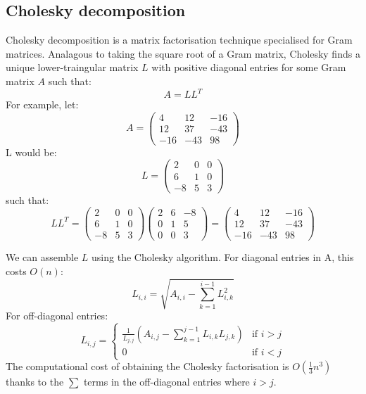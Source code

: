 \subsection{Cholesky decomposition}
Cholesky decomposition \cite{gp-ml} is a matrix factorisation technique specialised for Gram matrices. Analagous to taking the square root of a Gram matrix, Cholesky finds a unique lower-traingular matrix $L$ with positive diagonal entries for some Gram matrix $A$ such that:
\begin{equation} \label{eq:cholesky-factor}
    A = LL^T
\end{equation}
For example, let:
\begin{equation*}
    A = \begin{pmatrix}
        4 & 12 & -16 \\ 
        12 & 37 & -43 \\
        -16 & -43 & 98
    \end{pmatrix}
\end{equation*}
L would be:
\begin{equation*}
    L = \begin{pmatrix}
        2 & 0 & 0 \\
        6 & 1 & 0 \\
        -8 & 5 & 3 
    \end{pmatrix}
\end{equation*}
such that:
\begin{equation*}
    LL^T = \begin{pmatrix}
        2 & 0 & 0 \\
        6 & 1 & 0 \\
        -8 & 5 & 3 
    \end{pmatrix} \begin{pmatrix}
        2 & 6 & -8 \\
        0 & 1 & 5 \\
        0 & 0 & 3 
    \end{pmatrix} = \begin{pmatrix}
        4 & 12 & -16 \\ 
        12 & 37 & -43 \\
        -16 & -43 & 98
    \end{pmatrix}
\end{equation*}

We can assemble $L$ using the Cholesky algorithm. \cite{big-data} For diagonal entries in A, this costs $O(n)$:
\begin{equation*}
    L_{i,i} = \sqrt{A_{i,i} - \sum_{k=1}^{i-1} L_{i,k}^2}
\end{equation*}
For off-diagonal entries:
\begin{equation*}
    L_{i,j} = \begin{cases}
        \frac{1}{L_{j,j}} \left( A_{i,j} - \sum_{k=1}^{j-1} L_{i,k} L_{j,k} \right) & \text{if } i > j \\
        0 & \text{if } i < j
    \end{cases}
\end{equation*}
The computational cost of obtaining the Cholesky factorisation is $O(\frac{1}{3} n^3)$ thanks to the $\sum$ terms in the off-diagonal entries where $i > j$.

